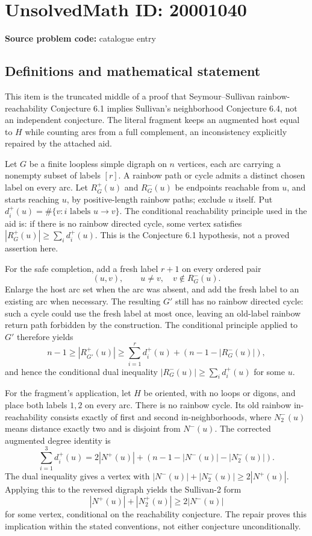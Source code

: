 \documentclass[11pt]{article}
\begin{document}
\section*{UnsolvedMath ID: 20001040}
\textbf{Source problem code:} catalogue entry
\subsection{Definitions and mathematical statement}
This item is the truncated middle of a proof that Seymour--Sullivan rainbow-reachability Conjecture 6.1 implies Sullivan's neighborhood Conjecture 6.4, not an independent conjecture. The literal fragment keeps an augmented host equal to $H$ while counting arcs from a full complement, an inconsistency explicitly repaired by the attached aid.

Let $G$ be a finite loopless simple digraph on $n$ vertices, each arc carrying a nonempty subset of labels $[r]$. A rainbow path or cycle admits a distinct chosen label on every arc. Let $R_G^+(u)$ and $R_G^-(u)$ be endpoints reachable from $u$, and starts reaching $u$, by positive-length rainbow paths; exclude $u$ itself. Put $d_i^+(u)=\#\{v:i\text{ labels }u\to v\}$. The conditional reachability principle used in the aid is: if there is no rainbow directed cycle, some vertex satisfies $|R_G^+(u)|\ge\sum_i d_i^+(u)$. This is the Conjecture 6.1 hypothesis, not a proved assertion here.

For the safe completion, add a fresh label $r+1$ on every ordered pair
\[
(u,v),\qquad u\ne v,\quad v\notin R_G^-(u).
\]
Enlarge the host arc set when the arc was absent, and add the fresh label to an existing arc when necessary. The resulting $G'$ still has no rainbow directed cycle: such a cycle could use the fresh label at most once, leaving an old-label rainbow return path forbidden by the construction. The conditional principle applied to $G'$ therefore yields
\[
n-1\ge|R_{G'}^+(u)|\ge\sum_{i=1}^r d_i^+(u)+(n-1-|R_G^-(u)|),
\]
and hence the conditional dual inequality $|R_G^-(u)|\ge\sum_i d_i^+(u)$ for some $u$.

For the fragment's application, let $H$ be oriented, with no loops or digons, and place both labels $1,2$ on every arc. There is no rainbow cycle. Its old rainbow in-reachability consists exactly of first and second in-neighborhoods, where $N_2^-(u)$ means distance exactly two and is disjoint from $N^-(u)$. The corrected augmented degree identity is
\[
\sum_{i=1}^3d_i^+(u)=2|N^+(u)|+(n-1-|N^-(u)|-|N_2^-(u)|).
\]
The dual inequality gives a vertex with $|N^-(u)|+|N_2^-(u)|\ge2|N^+(u)|$. Applying this to the reversed digraph yields the Sullivan-2 form
\[
|N^+(u)|+|N_2^+(u)|\ge2|N^-(u)|
\]
for some vertex, conditional on the reachability conjecture. The repair proves this implication within the stated conventions, not either conjecture unconditionally.
\end{document}
